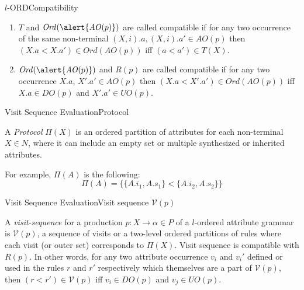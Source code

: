 \begin{frame}{$l$-ORD}{Compatibility}
    \begin{enumerate}
        \item \alert{$T$} and $\mathit{Ord}(\alert{\mathit{AO}(p)})$ are called compatible if for any two occurrence of the same non-terminal $(X, i).a, (X, i).a' \in \mathit{AO}(p)$ then $(X.a < X.a') \in \mathit{Ord}(\mathit{AO}(p))$ iff $(a < a') \in T(X)$.

        \item $\mathit{Ord}(\alert{\mathit{AO}(p)})$ and \alert{$R(p)$} are called compatible if for any two occurrence $X.a$, $\allowbreak X'.a' \allowbreak \in \mathit{AO}(p)$ then $(X.a < X'.a') \in \mathit{Ord}(\mathit{AO}(p))$ iff $X.a \in \mathit{DO}(p)$ and $X'.a'  \allowbreak \in \mathit{UO}(p)$.
    \end{enumerate}

\end{frame}

\begin{frame}{Visit Sequence Evaluation}{Protocol}

\begin{definition}
A \emph{Protocol} $\Pi(X)$ is an \alert{ordered partition of attributes} for each non-terminal $X \in N$, where it can include an empty set or multiple synthesized or inherited attributes.
\end{definition}

\newlinevspace

\begin{examples}
For example, $\Pi(A)$ is the following:
\[ \Pi(A) = \Big\{ \{ A.i_1, A.s_1 \} < \{ A.i_2, A.s_2 \} \Big\} \]
\end{examples}
\end{frame}


\begin{frame}{Visit Sequence Evaluation}{Visit sequence $\mathscr{V}(p)$}

\begin{definition}
A \emph{visit-sequence} for a production $p: X \rightarrow \alpha \in P$ of a $l$-ordered attribute grammar is $\mathscr{V}(p)$, a sequence of visits or a \alert{two-level ordered partitions} of rules where each visit (or outer set) corresponds to $\Pi(X)$. Visit sequence is \alert{compatible} with $R(p)$. In other words, for any two attribute occurrence $v_i$ and $v_i'$ defined or used in the rules $r$ and $r'$ respectively which themselves are a part of $\mathscr{V}(p)$, then $(r < r') \in \mathscr{V}(p)$ iff $v_i \in \mathit{DO}(p)$ and $v_j \in \mathit{UO}(p)$.
\end{definition}

\end{frame}


